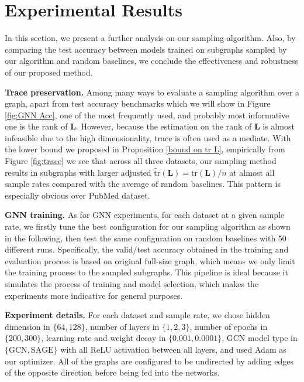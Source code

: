 \section{Experimental Results}

In this section, we present a further analysis on our sampling algorithm. Also, by comparing the test accuracy between models trained on subgraphs sampled by our algorithm and random baselines, we conclude the effectiveness and robustness of our proposed method. 


\noindent \textbf{Trace preservation.} Among many ways to evaluate a sampling algorithm over a graph, apart from test accuracy benchmarks which we will show in Figure \ref{fig:GNN Acc}, one of the most frequently used, and probably most informative one is the rank of $\mathbf{L}$. However, because the estimation on the rank of $\mathbf{L}$ is almost infeasible due to the high dimensionality, trace is often used as a mediate. With the lower bound we proposed in Proposition \ref{bound on tr L}, empirically from Figure \ref{fig:trace} we see that across all three datasets, our sampling method results in subgraphs with larger adjusted $\tilde{\text{tr}}(\textbf{L}) = \text{tr}(\mathbf{L}) / n$  at almost all sample rates compared with the average of random baselines. This pattern is especially obvious over PubMed dataset.

\noindent \textbf{GNN training.} As for GNN experiments, for each dataset at a given sample rate, we firstly tune the best configuration for our sampling algorithm as shown in the following, then test the same configuration on random baselines with 50 different runs. Specifically, the valid/test accuracy obtained in the training and evaluation process is based on original full-size graph, which means we only limit the training process to the sampled subgraphs. This pipeline is ideal because it simulates the process of training and model selection, which makes the experiments more indicative for general purposes. 

\noindent \textbf{Experiment details.} For each dataset and sample rate, we chose hidden dimension in $\{64, 128\}$, number of layers in $\{1,2,3\}$, number of epochs in $\{200, 300\}$, learning rate and weight decay in $\{0.001, 0.0001\}$, GCN model type in $\{\text{GCN}, \text{SAGE}\}$ with all ReLU activation between all layers, and used Adam as our optimizer. All of the graphs are configured to be undirected by adding edges of the opposite direction before being fed into the networks. 

